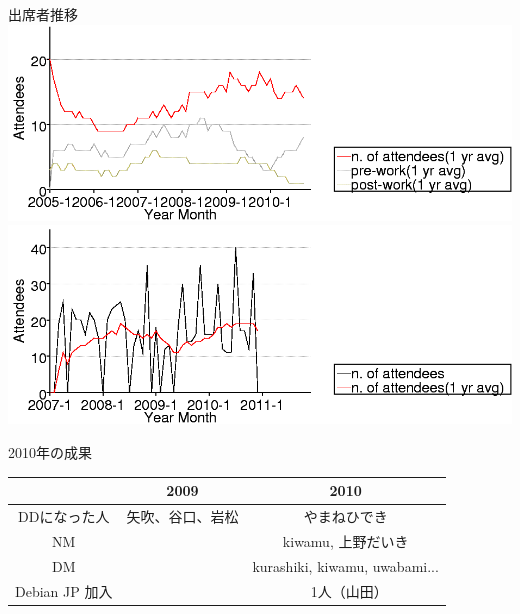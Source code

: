 \begin{frame}{出席者推移}
 \includegraphics[width=1\hsize]{image201012/memberanalysis/attend.png}\\
 \includegraphics[width=1\hsize]{image201012/memberanalysis/kansai.png}
\end{frame}

\begin{frame}{2010年の成果}

\begin{tabular}{|c|c|c|}
\hline
 & 2009 & 2010 \\
\hline
DDになった人 & 矢吹、谷口、岩松 & やまねひでき \\
NM &  & kiwamu, 上野だいき \\
DM & & kurashiki, kiwamu, uwabami...\\
Debian JP 加入 &　 & 1人（山田）　\\
\hline
\end{tabular}
 
\end{frame}

